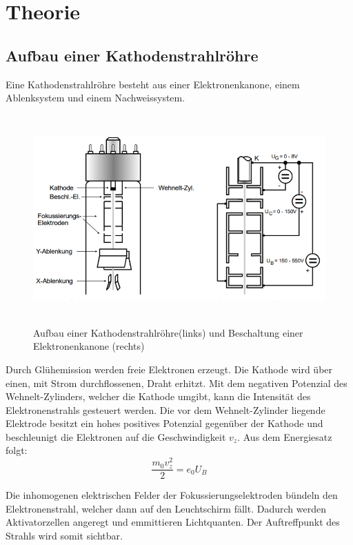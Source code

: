 \section{Theorie}
\label{sec:Theorie}



\subsection{Aufbau einer Kathodenstrahlröhre}

Eine Kathodenstrahlröhre besteht aus einer Elektronenkanone, einem Ablenksystem und einem Nachweissystem.

\begin{figure}[H]
  \centering
  \includegraphics[height=8cm]{kathodenstrahlroehre.PNG}
  \caption{Aufbau einer Kathodenstrahlröhre(links) und Beschaltung einer Elektronenkanone (rechts) \cite{sample}}
  \label{fig:kathode}
\end{figure}

Durch Glühemission werden freie Elektronen erzeugt. Die Kathode wird über einen, mit Strom durchflossenen, Draht
erhitzt.
Mit dem negativen Potenzial des Wehnelt-Zylinders, welcher die Kathode umgibt, kann die
Intensität des Elektronenstrahls gesteuert werden.
Die vor dem Wehnelt-Zylinder liegende Elektrode besitzt ein hohes positives Potenzial gegenüber der Kathode
und beschleunigt die Elektronen auf die Geschwindigkeit $v_z$.
Aus dem Energiesatz folgt:
\begin{equation}
  \frac{m_0 v_z^2}{2} = e_0 U_B
  \label{eqn:energie}
\end{equation}

Die inhomogenen elektrischen Felder der Fokussierungselektroden bündeln den Elektronenstrahl, welcher dann
auf den Leuchtschirm fällt. Dadurch werden Aktivatorzellen angeregt und emmittieren Lichtquanten.
Der Auftreffpunkt des Strahls wird somit sichtbar.

